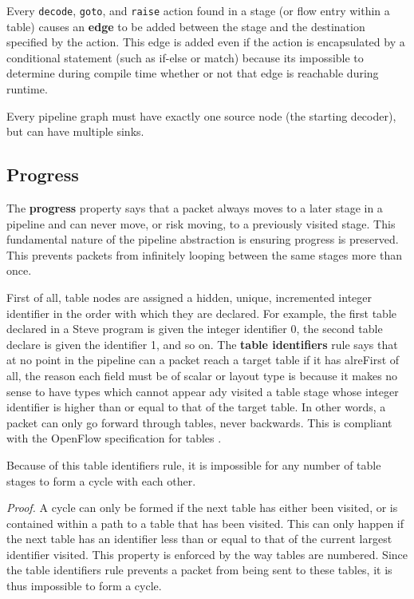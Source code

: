 Every \texttt{decode}, \texttt{goto}, and \texttt{raise} action found in a stage (or flow entry within a table) causes an \textbf{edge} to be added between the stage and the destination specified by the action. This edge is added even if the action is encapsulated by a conditional statement (such as if-else or match) because its impossible to determine during compile time whether or not that edge is reachable during runtime. 

Every pipeline graph must have exactly one source node (the starting decoder), but can have multiple sinks.

\subsection{Progress} \label{progress_guide}

The \textbf{progress} property says that a packet always moves to a later stage in a pipeline and can never move, or risk moving, to a previously visited stage. This fundamental nature of the pipeline abstraction is ensuring progress is preserved. This prevents packets from infinitely looping between the same stages more than once. 

First of all, table nodes are assigned a hidden, unique, incremented integer identifier in the order with which they are declared. For example, the first table declared in a Steve program is given the integer identifier 0, the second table declare is given the identifier 1, and so on. The \textbf{table identifiers} rule says that at no point in the pipeline can a packet reach a target table if it has alreFirst of all, the reason each field must be of scalar or layout type is because it makes no sense to have types which cannot appear ady visited a table stage whose integer identifier is higher than or equal to that of the target table. In other words, a packet can only go forward through tables, never backwards. This is compliant with the OpenFlow specification for tables \cite{openflow_spec}.

Because of this table identifiers rule, it is impossible for any number of table stages to form a cycle with each other.

\textit{Proof.} A cycle can only be formed if the next table has either been visited, or is contained within a path to a table that has been visited. This can only happen if the next table has an identifier less than or equal to that of the current largest identifier visited. This property is enforced by the way tables are numbered. Since the table identifiers rule prevents a packet from being sent to these tables, it is thus impossible to form a cycle.


